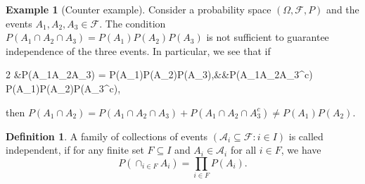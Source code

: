 \documentclass[letterpaper,10pt,english]{article}
\theoremstyle{plain}
\theoremstyle{definition}
\newtheorem{defn}[thm]{Definition}
\newtheorem{exmp}[thm]{Example}
\theoremstyle{remark}
\newcommand{\EQ}[1]{\begin{equation*}#1\end{equation*}}
\newcommand{\meq}[2]{\begin{xalignat*}{#1}#2\end{xalignat*}}
\newcommand{\R}{\mathbb{R}}
\newcommand{\sA}{\mathscr{A}}
\newcommand{\sB}{\mathscr{B}}
\newcommand{\sF}{\mathscr{F}}
\begin{document}
\begin{shaded}
\begin{exmp}[Counter example] 
Consider a probability space $(\Omega, \sF, P)$ and the events $A_1, A_2, A_3 \in \sF$. 
The condition $P(A_1\cap A_2\cap A_3) = P(A_1)P(A_2)P(A_3)$ is not sufficient to guarantee independence of the three events. 
In particular, we see that if
\meq{2}{
&P(A_1\cap A_2\cap A_3) = P(A_1)P(A_2)P(A_3),&&P(A_1\cap A_2\cap A_3^c) \neq P(A_1)P(A_2)P(A_3^c), 
}
then $P(A_1\cap A_2) =  P(A_1\cap A_2\cap A_3) + P(A_1\cap A_2\cap A_3^c) \neq P(A_1)P(A_2)$.
\end{exmp} 
\end{shaded}
\begin{defn}
A family of collections of events $(\sA_i \subseteq \sF: i \in I)$ is called independent,
if for any finite set $F \subseteq I$ and $A_i \in \sA_i$ for all $i \in F$, we have 
\EQ{
P(\cap_{i \in F}A_i) = \prod_{i \in F}P(A_i).
} 
\end{defn}
\end{document}
